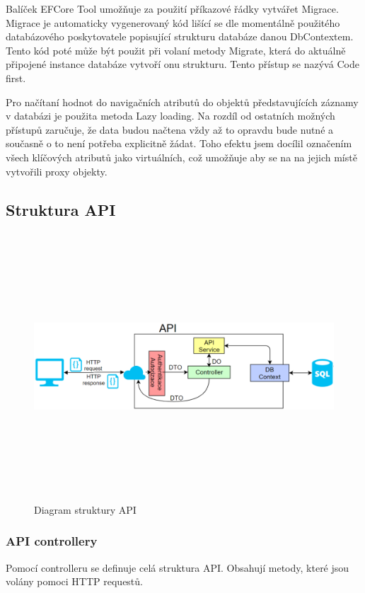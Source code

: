 \documentclass[
  biblatex,
  glossaries,
  index
]{kidiplom}
\begin{document}
Balíček EFCore Tool umožňuje za použití příkazové řádky vytvářet Migrace. Migrace je automaticky vygenerovaný kód lišící se dle momentálně použitého databázového poskytovatele popisující strukturu databáze danou DbContextem. Tento kód poté může být použit při volaní metody Migrate, která do aktuálně připojené instance databáze vytvoří onu strukturu. Tento přístup se nazývá Code first.

Pro načítaní hodnot do navigačních atributů do objektů představujících záznamy v databázi je použita metoda Lazy loading. Na rozdíl od ostatních možných přístupů zaručuje, že data budou načtena vždy až to opravdu bude nutné a současně o to není potřeba explicitně žádat. Toho efektu jsem docílil označením všech klíčových atributů jako virtuálních, což umožňuje aby se na na jejich místě vytvořili proxy objekty.

\subsection{Struktura API}
\begin{figure}[H]
  	\centering
 	 \includegraphics[width=14cm,height=10cm,keepaspectratio]{API_Diagram}
 	 \caption{Diagram struktury API}
\end{figure}

\subsubsection{API controllery}
Pomocí controlleru se definuje celá struktura API. Obsahují metody, které jsou volány pomoci HTTP requestů. 
\end{document}
